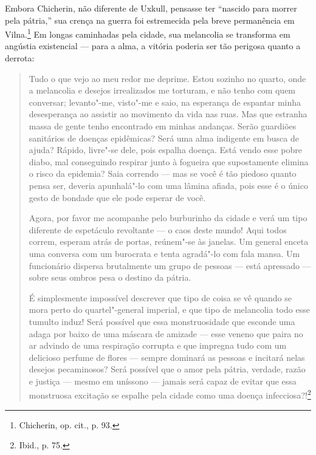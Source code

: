 Embora Chicherin, não diferente de Uxkull, pensasse ter ``nascido para
morrer pela pátria,'' sua crença na guerra foi estremecida pela breve
permanência em Vilna.\footnote{Chicherin, op. cit., p. 93.} Em longas
caminhadas pela cidade, sua melancolia se transforma em angústia
existencial --- para a alma, a vitória poderia ser tão perigosa quanto a
derrota:

\begin{quote}
Tudo o que vejo ao meu redor me deprime. Estou sozinho no quarto, onde a
melancolia e desejos irrealizados me torturam, e não tenho com quem
conversar; levanto"-me, visto"-me e saio, na esperança de espantar minha
desesperança ao assistir ao movimento da vida nas ruas. Mas que estranha
massa de gente tenho encontrado em minhas andanças. Serão guardiões
sanitários de doenças epidêmicas? Será uma alma indigente em busca de
ajuda? Rápido, livre"-se dele, pois espalha doença. Está vendo esse pobre
diabo, mal conseguindo respirar junto à fogueira que supostamente
elimina o risco da epidemia? Saia correndo --- mas se você é tão piedoso
quanto pensa ser, deveria apunhalá"-lo com uma lâmina afiada, pois esse é
o único gesto de bondade que ele pode esperar de você.

Agora, por favor me acompanhe pelo burburinho da cidade e verá um tipo
diferente de espetáculo revoltante --- o caos deste mundo! Aqui todos
correm, esperam atrás de portas, reúnem"-se às janelas. Um general enceta
uma conversa com um burocrata e tenta agradá"-lo com fala mansa. Um
funcionário dispersa brutalmente um grupo de pessoas --- está apressado ---
sobre seus ombros pesa o destino da pátria.

É simplesmente impossível descrever que tipo de coisa se vê quando se
mora perto do quartel"-general imperial, e que tipo de melancolia todo
esse tumulto induz! Será possível que essa monstruosidade que esconde
uma adaga por baixo de uma máscara de amizade --- esse veneno que paira no
ar advindo de uma respiração corrupta e que impregna tudo com um
delicioso perfume de flores --- sempre dominará as pessoas e incitará
nelas desejos pecaminosos? Será possível que o amor pela pátria,
verdade, razão e justiça --- mesmo em uníssono --- jamais será capaz de
evitar que essa monstruosa excitação se espalhe pela cidade como uma
doença infecciosa?!\footnote{Ibid., p. 75.}
\end{quote}

